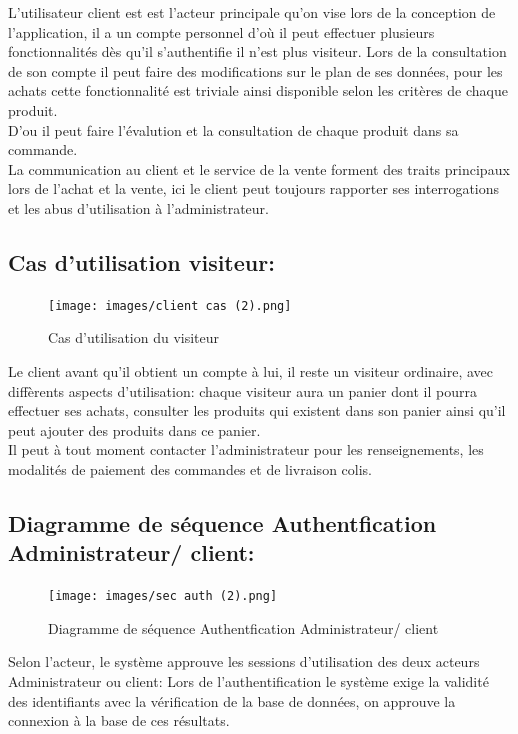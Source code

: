 \documentclass[a4paper]{report}
\begin{document}
\begin{doublespace}
\begin{doublespace}
\begin{doublespace}
\begin{doublespace}
\begin{doublespace}
L'utilisateur client est est l'acteur principale qu'on vise lors de la conception de l'application, il a un compte personnel d'où il peut effectuer plusieurs fonctionnalités dès qu'il s'authentifie il n'est plus visiteur. Lors de la consultation de son compte il peut faire des modifications sur le plan de ses données, pour les achats cette fonctionnalité est triviale ainsi disponible selon les critères de chaque produit.\\D'ou il peut faire l'évalution et la consultation de chaque produit dans sa commande. \\ La communication au client et le service de la vente forment des traits principaux lors de l'achat et la vente, ici le client peut toujours rapporter ses interrogations et les abus d'utilisation à l'administrateur. 
\newpage
\subsection{Cas d'utilisation visiteur:}
\begin{figure}[H]
\begin{center}
 \texttt{[image: images/client cas (2).png]}
 \caption{Cas d'utilisation du visiteur}
 \end{center}
\end{figure}

Le client avant qu'il obtient un compte à lui, il reste un visiteur ordinaire, avec diffèrents aspects d'utilisation: chaque visiteur aura un panier dont il pourra effectuer ses achats, consulter les produits qui existent dans son panier ainsi qu'il peut ajouter des produits dans ce panier.\\
Il peut à tout moment contacter l'administrateur pour les renseignements, les modalités de paiement des commandes et de livraison colis.

\subsection{Diagramme de séquence Authentfication Administrateur/ client:}
\begin{figure}[H]
\begin{center}
 \texttt{[image: images/sec auth (2).png]}
 \caption{Diagramme de séquence Authentfication Administrateur/ client}
 \end{center}
\end{figure}
Selon l'acteur, le système approuve les sessions d'utilisation des deux acteurs Administrateur ou client: Lors de l'authentification le système exige la validité des identifiants avec la vérification de la base de données, on approuve la connexion à la base de ces résultats.

\end{doublespace}
\end{doublespace}
\end{doublespace}
\end{doublespace}
\end{doublespace}
\end{document}
